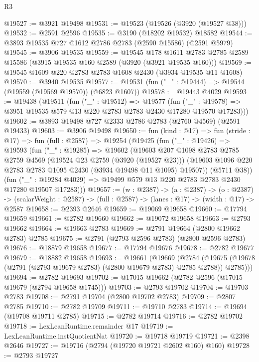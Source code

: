 \begin{lexlean}{R3}
\begin{coremodule}
@19527 := @3921 @19498
@19531 := @19523 (@19526 (@3920 (@19527 @38)))
@19532 := @2591 @2596
@19535 := @3190 (@18202 @19532) @18582
@19544 := @3893 @19535 @727 @1612 @2786 @2783 (@2590 @15586) (@2591 @5979)
@19545 := @3906 @19535
@19559 := @19545
    @178
    @1611
    @2783
    @2785
    @2589
    @15586
    (@3915 @19535 @160 @2589 (@3920 (@3921 @19535 @160)))
@19569 := @19545 @1609 @220 @2783 @2783 @1608 @2430 (@3934 @19535 @11 @1608)
@19570 := @3940 @19535
@19577 := @19531 (fun ("_" : @19444) => @19544 (@19559 (@19569 @19570)) (@6823 @1607))
@19578 := @19443 @4029
@19593 := @19438
    (@19511
      (fun ("_" : @19512) =>
      @19577
        (fun ("_" : @19578) => @3951 @19535 @579 @13 @220 @2783 @2783 @2430 @17280 @19570 @17283)))
@19602 := @3893 @19498 @727 @2333 @2786 @2783 (@2760 @4569) (@2591 @19433)
@19603 := @3906 @19498
@19650 := fun (kind : @17) =>
  fun (stride : @17) =>
  fun (full : @2587) =>
  @19254
    (@19425
      (fun ("_" : @19426) =>
      @19593
        (fun ("_" : @19285) =>
        @19602
          (@19603
            @207
            @1098
            @2783
            @2785
            @2759
            @4569
            (@19524 @23 @2759 (@3920 (@19527 @23)))
            (@19603 @1096 @220 @2783 @2783 @1095 @2430 (@3934 @19498 @11 @1095) @19507))
          (@5711 @38))
        (fun ("_" : @19284 @4029) => @19499 @579 @13 @220 @2783 @2783 @2430 @17280 @19507 @17283)))
@19657 := (w : @2387) ->
  (a : @2387) ->
  (o : @2387) -> (scalarWeight : @2587) -> (full : @2587) -> (lanes : @17) -> (width : @17) -> @2587
@19658 := @2393 @2646
@19659 := @19069 @19658
@19660 := @17794 @19659
@19661 := @2782 @19660
@19662 := @19072 @19658
@19663 := @2793 @19662
@19664 := @19663 @2783
@19669 := @2791 @19664 (@2800 @19662 @2783) @2785
@19675 := @2791 (@2793 @2596 @2783) (@2800 @2596 @2783)
@19676 := @18879 @19658
@19677 := @17794 @19676
@19678 := @2782 @19677
@19679 := @18882 @19658
@19693 := @19661
    (@19669
      (@2784 (@19675 (@19678 (@2791 (@2793 @19679 @2783) (@2800 @19679 @2783) @2785 @2788)) @2785)))
@19694 := @2782 @19693
@19702 := @17015 @19662 (@2782 @2596 (@17015 @19679 (@2794 @19658 @1745)))
@19703 := @2793 @19702
@19704 := @19703 @2783
@19708 := @2791 @19704 (@2800 @19702 @2783)
@19709 := @2807 @2785
@19710 := @2782 @19709
@19711 := @19710 @2783
@19714 := @19694 (@19708 @19711 @2785)
@19715 := @2782 @19714
@19716 := @2782 @19702
@19718 := LexLeanRuntime.remainder @17
@19719 := LexLeanRuntime.instQuotientNat
@19720 := @19718 @19719
@19721 := @2398 @2646
@19727 := @19716 (@2794 (@19720 @19721 @2602 @160) @160)
@19728 := @2793 @19727

\end{coremodule}
\end{lexlean}
